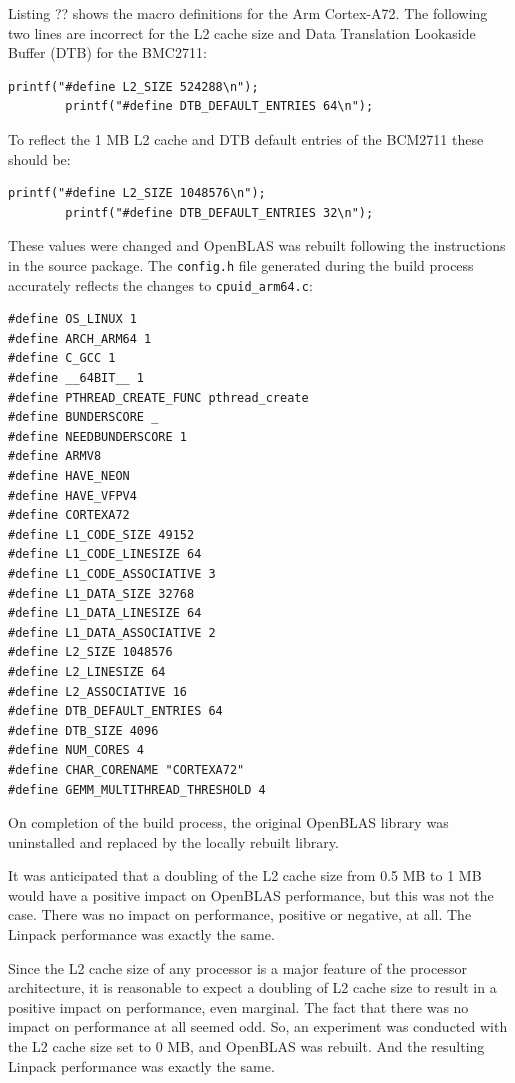\documentclass{report}
\begin{document}
Listing ?? shows the macro definitions for the Arm Cortex-A72. The following two lines are incorrect for the L2 cache size and Data Translation Lookaside Buffer (DTB) for the BMC2711:

\lstset{style=listing}
\begin{lstlisting}[numbers=none]
		printf("#define L2_SIZE 524288\n");
		printf("#define DTB_DEFAULT_ENTRIES 64\n");
\end{lstlisting}

To reflect the 1 MB L2 cache and DTB default entries of the BCM2711 these should be:

\lstset{style=listing}
\begin{lstlisting}[numbers=none]
		printf("#define L2_SIZE 1048576\n");
		printf("#define DTB_DEFAULT_ENTRIES 32\n");
\end{lstlisting}

These values were changed and OpenBLAS was rebuilt following the instructions in the source package. The \verb|config.h| file generated during the build process accurately reflects the changes to \verb|cpuid_arm64.c|:

\lstset{style=listing}
\begin{lstlisting}[caption=config.h]
#define OS_LINUX 1
#define ARCH_ARM64 1
#define C_GCC 1
#define __64BIT__ 1
#define PTHREAD_CREATE_FUNC pthread_create
#define BUNDERSCORE _
#define NEEDBUNDERSCORE 1
#define ARMV8
#define HAVE_NEON
#define HAVE_VFPV4
#define CORTEXA72
#define L1_CODE_SIZE 49152
#define L1_CODE_LINESIZE 64
#define L1_CODE_ASSOCIATIVE 3
#define L1_DATA_SIZE 32768
#define L1_DATA_LINESIZE 64
#define L1_DATA_ASSOCIATIVE 2
#define L2_SIZE 1048576
#define L2_LINESIZE 64
#define L2_ASSOCIATIVE 16
#define DTB_DEFAULT_ENTRIES 64
#define DTB_SIZE 4096
#define NUM_CORES 4
#define CHAR_CORENAME "CORTEXA72"
#define GEMM_MULTITHREAD_THRESHOLD 4
\end{lstlisting}

On completion of the build process, the original OpenBLAS library was uninstalled and replaced by the locally rebuilt library.

It was anticipated that a doubling of the L2 cache size from 0.5 MB to 1 MB would have a positive impact on OpenBLAS performance, but this was not the case. There was no impact on performance, positive or negative, at all. The Linpack performance was exactly the same.

Since the L2 cache size of any processor is a major feature of the processor architecture, it is reasonable to expect a doubling of L2 cache size to result in a positive impact on performance, even marginal. The fact that there was no impact on performance at all seemed odd. So, an experiment was conducted with the L2 cache size set to 0 MB, and OpenBLAS was rebuilt. And the resulting Linpack performance was exactly the same. 
\end{document}
